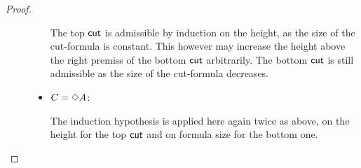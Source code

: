 \begin{proof}
\begin{description}
\begin{itemize}
\begin{smallequation*}\hspace*{-7em}
\end{smallequation*}
The top $\mathsf{cut}$ is admissible by induction on the height, as the size of the cut-formula is constant. This however may increase the height above the right premiss of the bottom $\mathsf{cut}$ arbitrarily. The bottom $\mathsf{cut}$ is still admissible as the size of the cut-formula decreases.

                \item $C=\mathord{\Diamond} A$:

\begin{smallequation*}
\end{smallequation*}

\begin{smallequation*}
\end{smallequation*}
The induction hypothesis is applied here again twice as above, on the height for the top $\mathsf{cut}$ and on formula size for the bottom one.
                \end{itemize}
                \end{description}
\end{proof}


